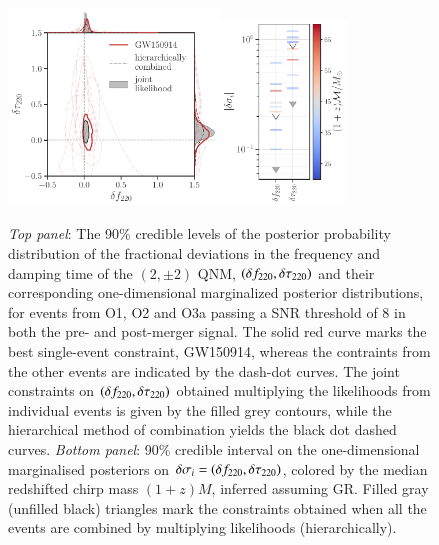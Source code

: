 \begin{figure}
        \includegraphics[width=0.5\textwidth]{figures/rin_pseob_results_v2.pdf}\includegraphics[width=0.3\textwidth]{figures/rin_all_events_bounds.pdf}
        \caption{\emph{Top panel}: The 90\% credible levels of the posterior probability distribution of the fractional deviations in the frequency and damping time of the $(2,\pm 2)$ QNM, $(\delta f_{\text{220}},\delta \tau_{\text{220}})$ and their corresponding one-dimensional marginalized posterior distributions, for events from O1, O2 and O3a passing a SNR threshold of $8$ in both the pre- and post-merger signal. The solid red curve marks the best single-event constraint, GW150914, whereas the contraints from the other events are indicated by the dash-dot curves. The joint constraints on $(\delta f_{\text{220}},\delta \tau_{\text{220}})$ obtained multiplying the likelihoods from individual events is given by the filled grey contours, while the hierarchical method of combination yields the black dot dashed curves. \emph{Bottom panel}: 90\% credible interval on the one-dimensional marginalised posteriors on $\delta \sigma_i=(\delta f_{\text{220}},\delta \tau_{\text{220}})$, colored by the median redshifted chirp mass $(1 + z)M$, inferred assuming GR. Filled gray (unfilled black) triangles mark the constraints obtained when all the events are combined by multiplying likelihoods (hierarchically).}
        \label{fig:o1o2_events}
\end{figure}

